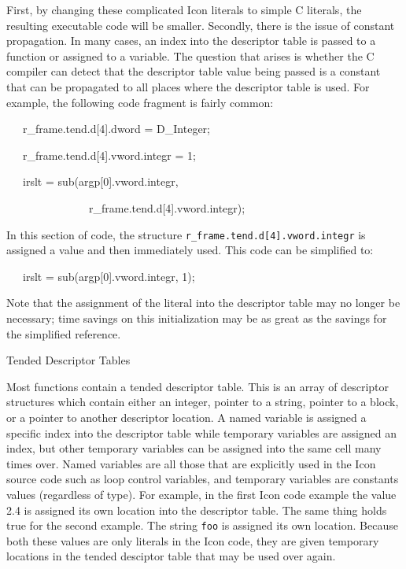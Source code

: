 First, by changing these complicated Icon literals to simple C
literals, the resulting executable code will be smaller. Secondly,
there is the issue of constant propagation. In many cases, an index
into the descriptor table is passed to a function or assigned to a
variable. The question that arises is whether the C compiler can
detect that the descriptor table value being passed is a constant that
can be propagated to all places where the descriptor table is used.
For example, the following code fragment is fairly common:

{\ttfamily\mdseries
\ \ \ r\_frame.tend.d[4].dword = D\_Integer;}

{\ttfamily\mdseries
\ \ \ r\_frame.tend.d[4].vword.integr = 1;}

{\ttfamily\mdseries
\ \ \ irslt = sub(argp[0].vword.integr,}

{\ttfamily\mdseries
\ \ \ \ \ \ \ \ \ \ \ \ \ \ \ r\_frame.tend.d[4].vword.integr);}

In this section of code, the structure
\texttt{r\_frame.tend.d[4].vword.integr} is assigned a value and then
immediately used. This code can be simplified to:

{\ttfamily\mdseries
\ \ \ irslt = sub(argp[0].vword.integr, 1);}


Note that the assignment of the literal into the descriptor table may
no longer be necessary; time savings on this initialization may be as
great as the savings for the simplified reference.

{\sffamily
Tended Descriptor Tables}


Most functions contain a tended descriptor table. This is an array of
descriptor structures which contain either an integer, pointer to a
string, pointer to a block, or a pointer to another descriptor
location. A named variable is assigned a specific index into the
descriptor table while temporary variables are assigned an index, but
other temporary variables can be assigned into the same cell many
times over. Named variables are all those that are explicitly used in
the Icon source code such as loop control variables, and temporary
variables are constants values (regardless of type). For example, in
the first Icon code example the value 2.4 is assigned its own location
into the descriptor table. The same thing holds true for the second
example. The string \texttt{{\textquotedbl}foo{\textquotedbl}} is
assigned its own location. Because both these values are only literals
in the Icon code, they are given temporary locations in the tended
desciptor table that may be used over again.

